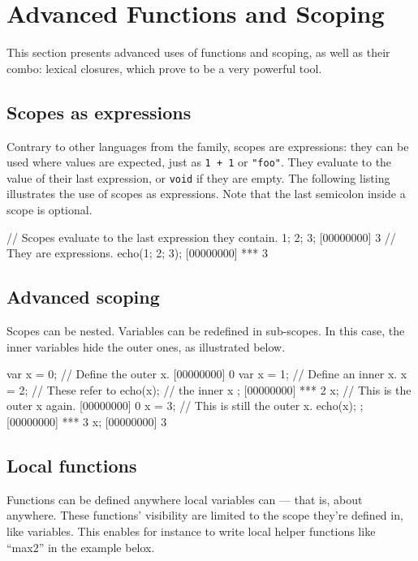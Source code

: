 \chapter{Advanced Functions and Scoping}
\label{sec:tut:function}

This section presents advanced uses of functions and scoping, as well
as their combo: lexical closures, which prove to be a very powerful
tool.

\section{Scopes as expressions}

Contrary to other languages from the \C family, scopes are
expressions: they can be used where values are expected, just as
\lstinline|1 + 1| or \lstinline|"foo"|.
They evaluate to the value of their last expression, or
\lstinline|void| if they are
empty. The following listing illustrates the use of scopes as
expressions. Note that the last semicolon inside a scope is optional.

\begin{urbiscript}
// Scopes evaluate to the last expression they contain.
{ 1; 2; 3};
[00000000] 3
// They are expressions.
echo({1; 2; 3});
[00000000] *** 3
\end{urbiscript}

\section{Advanced scoping}

Scopes can be nested. Variables can be redefined in sub-scopes. In
this case, the inner variables hide the outer ones, as illustrated
below.

\begin{urbiscript}[firstnumber=last]
var x = 0;   // Define the outer x.
[00000000] 0
{
  var x = 1; // Define an inner x.
  x = 2;     // These refer to
  echo(x);   // the inner x
};
[00000000] *** 2
x;           // This is the outer x again.
[00000000] 0
{
  x = 3;     // This is still the outer x.
  echo(x);
};
[00000000] *** 3
x;
[00000000] 3
\end{urbiscript}

\section{Local functions}

Functions can be defined anywhere local variables can --- that is,
about anywhere. These functions' visibility are limited to the scope
they're defined in, like variables. This enables for instance to write
local helper functions like ``max2'' in the example belox.

